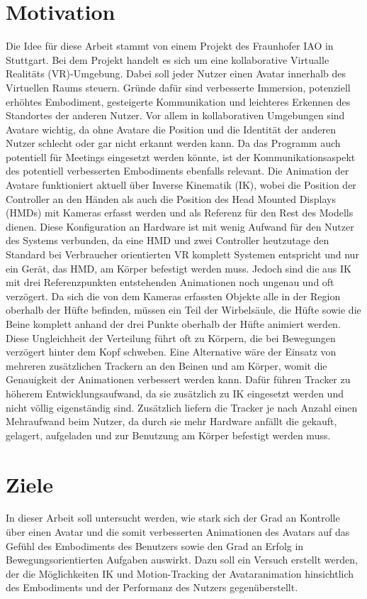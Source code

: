 \section{Motivation}
Die Idee für diese Arbeit stammt von einem Projekt des Fraunhofer IAO in Stuttgart. Bei dem Projekt handelt es sich um eine kollaborative Virtualle Realitäts (VR)-Umgebung. Dabei soll jeder Nutzer einen Avatar innerhalb des Virtuellen Raums steuern. 
Gründe dafür sind verbesserte Immersion, potenziell erhöhtes Embodiment, gesteigerte Kommunikation und leichteres Erkennen des Standortes der anderen Nutzer. Vor allem in kollaborativen Umgebungen sind Avatare wichtig, da ohne Avatare die Position und die Identität der anderen Nutzer schlecht oder gar nicht erkannt werden kann. Da das Programm auch potentiell für Meetings eingesetzt werden könnte, ist der Kommunikationsaspekt des potentiell verbesserten Embodiments ebenfalls relevant. Die Animation der Avatare funktioniert aktuell über Inverse Kinematik (IK), wobei die Position der Controller an den Händen als auch die Position des Head Mounted Displays (HMDs) mit Kameras erfasst werden und als Referenz für den Rest des Modells dienen. Diese Konfiguration an Hardware ist mit wenig Aufwand für den Nutzer des Systems verbunden, da eine HMD und zwei Controller heutzutage den Standard bei Verbraucher orientierten VR komplett Systemen entspricht und nur ein Gerät, das HMD, am Körper befestigt werden muss. Jedoch sind die aus IK mit drei Referenzpunkten entstehenden Animationen noch ungenau und oft verzögert. Da sich die von dem Kameras erfassten Objekte alle in der Region oberhalb der Hüfte befinden, müssen ein Teil der Wirbelsäule, die Hüfte sowie die Beine komplett anhand der drei Punkte oberhalb der Hüfte animiert werden. Diese Ungleichheit der Verteilung führt oft zu Körpern, die bei Bewegungen verzögert hinter dem Kopf schweben.
Eine Alternative wäre der Einsatz von mehreren zusätzlichen Trackern an den Beinen und am Körper, womit die Genauigkeit der Animationen verbessert werden kann. Dafür führen Tracker zu höherem Entwicklungsaufwand, da sie zusätzlich zu IK eingesetzt werden und nicht völlig eigenständig sind. Zusätzlich liefern die Tracker je nach Anzahl einen Mehraufwand beim Nutzer, da durch sie mehr Hardware anfällt die gekauft, gelagert, aufgeladen und zur Benutzung am Körper befestigt werden muss.


\section{Ziele}
In dieser Arbeit soll untersucht werden, wie stark sich der Grad an Kontrolle über einen Avatar und die somit verbesserten Animationen des Avatars auf das Gefühl des Embodiments des Benutzers  sowie den Grad an Erfolg in Bewegungsorientierten Aufgaben auswirkt. Dazu soll ein Versuch erstellt werden, der die Möglichkeiten IK und Motion-Tracking der Avataranimation hinsichtlich des Embodiments und der Performanz des Nutzers gegenüberstellt.


